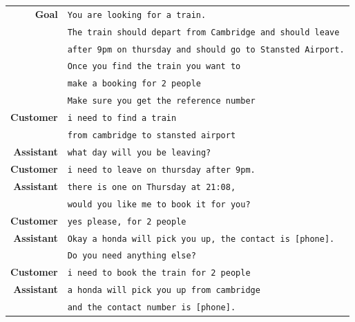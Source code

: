 \begin{table}[]
    \centering
    \begin{tabular}{r|l}
    \toprule
         \textbf{Goal} & \texttt{You are looking for a train.}\\
         & \texttt{The train should depart from {\color{cyan!80!yellow!80!black!100 }Cambridge} and should leave} \\
         & \texttt{{\color{cyan!80!yellow!80!black!100 }after 9pm} on {\color{cyan!80!yellow!80!black!100 }thursday} and should go to {\color{cyan!80!yellow!80!black!100 }Stansted Airport}.} \\
         & \texttt{Once you find the train you want to} \\
         & \texttt{make a {\color{orange!50!yellow!90!black!100!}booking for 2 people}}\\
         & \texttt{Make sure you get the {\color{orange!50!yellow!90!black!100!}reference number}} \\
         \midrule
         \textbf{Customer} & \texttt{i need to find a train} \\
         & \texttt{from {\color{cyan!80!yellow!80!black!100 }cambridge} to {\color{cyan!80!yellow!80!black!100 }stansted airport}} \\
         \textbf{Assistant} & \texttt{what day will you be leaving?}\\
         \textbf{Customer} & \texttt{i need to leave on {\color{cyan!80!yellow!80!black!100 }thursday} {\color{cyan!80!yellow!80!black!100 }after 9pm.}}\\
         \textbf{Assistant} & \texttt{there is one on Thursday at {\color{orange!50!yellow!90!black!100!}21:08},}\\
         & \texttt{would you like me to book it for you?}\\
         \textbf{Customer} & \texttt{yes please, for 2 people} \\
         \textbf{Assistant} & \texttt{{\color{red!100!yellow!90!black!100!}Okay a honda will pick you up, the contact is [phone].}} \\
         & \texttt{Do you need anything else?} \\
         \textbf{Customer} & \texttt{i need to book the train for 2 people} \\
         \textbf{Assistant} & \texttt{{\color{red!100!yellow!90!black!100!}a honda will pick you up from cambridge }}\\
         & \texttt{{\color{red!100!yellow!90!black!100!}and the contact number is [phone].}}\\

\end{tabular}
\end{table}
